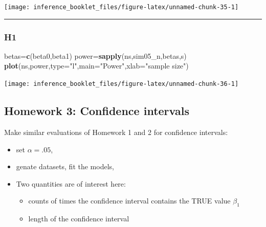 \documentclass[]{article}
\newenvironment{Shaded}{\begin{snugshade}}{\end{snugshade}}
\newcommand{\KeywordTok}[1]{\textcolor[rgb]{0.13,0.29,0.53}{\textbf{#1}}}
\newcommand{\DataTypeTok}[1]{\textcolor[rgb]{0.13,0.29,0.53}{#1}}
\newcommand{\StringTok}[1]{\textcolor[rgb]{0.31,0.60,0.02}{#1}}
\newcommand{\NormalTok}[1]{#1}
\providecommand{\tightlist}{%
  \setlength{\itemsep}{0pt}\setlength{\parskip}{0pt}}
\begin{document}
\begin{center}\texttt{[image: inference\_booklet\_files/figure-latex/unnamed-chunk-35-1]} \end{center}

\begin{center}\rule{0.5\linewidth}{\linethickness}\end{center}

\subsubsection{H1}\label{h1}

\begin{Shaded}
\begin{Highlighting}[]
\NormalTok{betas=}\KeywordTok{c}\NormalTok{(beta0,beta1)}
\NormalTok{power=}\KeywordTok{sapply}\NormalTok{(ns,sim05_n,betas,s)}
\KeywordTok{plot}\NormalTok{(ns,power,}\DataTypeTok{type=}\StringTok{"l"}\NormalTok{,}\DataTypeTok{main=}\StringTok{"Power"}\NormalTok{,}\DataTypeTok{xlab=}\StringTok{"sample size"}\NormalTok{)}
\end{Highlighting}
\end{Shaded}

\begin{center}\texttt{[image: inference\_booklet\_files/figure-latex/unnamed-chunk-36-1]} \end{center}

\subsection{Homework 3: Confidence
intervals}\label{homework-3-confidence-intervals}

Make similar evaluations of Homework 1 and 2 for confidence intervals:

\begin{itemize}
\tightlist
\item
  set \(\alpha=.05\),
\item
  genate datasets, fit the models,
\item
  Two quantities are of interest here:

  \begin{itemize}
  \tightlist
  \item
    counts of times the confidence interval contains the TRUE value
    \(\beta_1\)
  \item
    length of the confidence interval
  \end{itemize}
\end{itemize}
\end{document}
